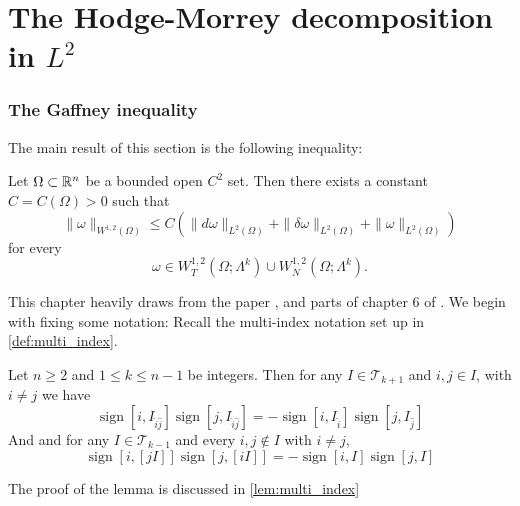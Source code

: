 
\chapter{The Hodge-Morrey decomposition in $L^2$}

\subsection{The Gaffney inequality}
The main result of this section is the following inequality:
{\color{purple}
\begin{theorem}
\label{thm:gaffney}
Let $\Omega\subset\mathbb R^n$ be a bounded open $C^2$ set. Then there exists a
constant $C=C(\Omega)>0$ such that
\begin{equation}
    \|\omega\|_{W^{1,2}(\Omega)}
    \leq
    C\left(
        \|d\omega\|_{L^2(\Omega)}
        +\|\delta\omega\|_{L^2(\Omega)}
        +\|\omega\|_{L^2(\Omega)}
    \right)
\end{equation}
for every
\[
    \omega\in
    W^{1,2}_{T}(\Omega;\Lambda^k)\cup
    W^{1,2}_{N}(\Omega;\Lambda^k).
\]
\end{theorem}
}
This chapter heavily draws from the paper \cite{Csato_2018}, and parts of chapter $6$ of \cite{CsatoDacorognaKneuss2012}.
We begin with fixing some notation: Recall the multi-index notation set up in \ref{def:multi_index}. 

\begin{lemma}
    Let $n\geq 2$ and $1\leq k\leq n-1$ be integers. Then for any $I\in \mathscr T_{k+1}$ and $i,j \in I$, with $i\neq j$ we have \begin{equation}
\operatorname{sign}[i,I_{\hat{i}\hat{j}}]\operatorname{sign}[j,I_{\hat{i}\hat{j}}]=-\operatorname{sign}[i,I_{\hat{i}}]\operatorname{sign}[j,I_{\hat{j}}]
\end{equation}
And and for any $I\in \mathscr T_{k-1}$ and every $i,j \not\in I$ with $i\neq j$,\begin{equation}
    \operatorname{sign}[i,[jI]]\operatorname{sign}[j,[iI]]=-\operatorname{sign}[i,I]\operatorname{sign}[j,I]
\end{equation}

\end{lemma} 
The proof of the lemma is discussed in \ref{lem:multi_index}

